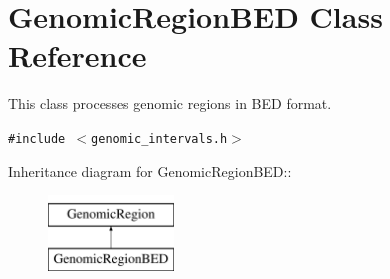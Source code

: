 \hypertarget{classGenomicRegionBED}{
\section{GenomicRegionBED Class Reference}
\label{classGenomicRegionBED}
}
This class processes genomic regions in BED format.  


{\tt \#include $<$genomic\_\-intervals.h$>$}

Inheritance diagram for GenomicRegionBED::\begin{figure}[H]
\begin{center}
\leavevmode
\includegraphics[height=2cm]{classGenomicRegionBED}
\end{center}
\end{figure}
